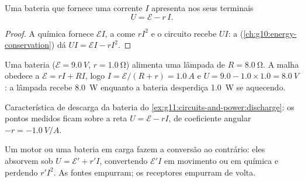 \begin{proposition}\label{prop:g11:circuits-and-power:terminal}
Uma bateria que fornece uma corrente $I$ apresenta nos seus terminais
\[ U = \mathcal{E} - r\,I . \]
\end{proposition}

\begin{proof}
A química fornece $\mathcal{E}I$, a  come $rI^2$ e o
circuito recebe $UI$: a 
(\cref{ch:g10:energy-conservation}) dá $UI = \mathcal{E}I - rI^2$.
\end{proof}

\begin{example}\label{ex:g11:circuits-and-power:discharge}
Uma bateria ($\mathcal{E} = \qty{9.0}{V}$, $r = \qty{1.0}{\ohm}$)
alimenta uma lâmpada de  $R = \qty{8.0}{\ohm}$. A malha
obedece a $\mathcal{E} = rI + RI$, logo
$I = \mathcal{E}/(R + r) = \qty{1.0}{A}$ e
$U = 9.0 - 1.0 \times 1.0 = \qty{8.0}{V}$: a lâmpada recebe \qty{8.0}{W}
enquanto a bateria desperdiça \qty{1.0}{W} se aquecendo.
\end{example}

\begin{omfigure}

{\small Característica de descarga da bateria do
\cref{ex:g11:circuits-and-power:discharge}: os pontos medidos ficam sobre
a reta $U = \mathcal{E} - rI$, de coeficiente angular
$-r = \qty{-1.0}{V/A}$.}
\end{omfigure}

\begin{remark}[Receptores]\label{rem:g11:circuits-and-power:receivers}
Um motor ou uma bateria em carga fazem a conversão ao contrário: eles
absorvem sob $U = \mathcal{E}' + r'I$, convertendo $\mathcal{E}'I$ em
movimento ou em química e perdendo $r'I^2$. As fontes empurram; os
receptores empurram de volta.
\end{remark}

